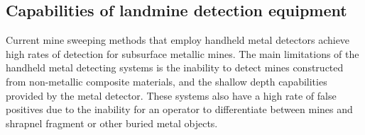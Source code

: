 \documentclass[main.tex]{subfiles}
\begin{document}
\begin{appendices}



\section{Capabilities of landmine detection equipment}
Current mine sweeping methods that employ handheld metal detectors achieve high rates of detection for subsurface metallic mines. The main limitations of the handheld metal detecting systems is the inability to detect mines constructed from non-metallic composite materials, and the shallow depth capabilities provided by the metal detector. These systems also have a high rate of false positives due to the inability for an operator to differentiate between mines and shrapnel fragment or other buried metal objects.


\end{appendices}
\end{document}
